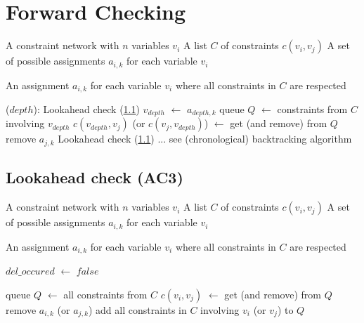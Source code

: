 \documentclass[alternative-exam.tex]{subfiles}
\newcommand{\algorithmicinput}{\textbf{Input:}}
\newcommand{\algorithmicoutput}{\textbf{Output:}}
\newcommand{\INPUT}{\item[\algorithmicinput]}
\newcommand{\OUTPUT}{\item[\algorithmicoutput]}
\newcommand{\algorithmicalgo}{\textbf{Algorithm:}}
\newcommand{\ALGO}{\item[\algorithmicalgo]}
\begin{document}
\section{Forward Checking}
\begin{algorithmic}
\label{forwardchecking}
\INPUT
\STATE A constraint network with $n$ variables $v_i$
\STATE A list $C$ of constraints $c(v_i,v_j)$
\STATE A set of possible assignments $a_{i,k}$ for each variable $v_i$

\OUTPUT
\STATE An assignment $a_{i,k}$ for each variable $v_i$ where all constraints in $C$ are respected
\end{algorithmic}\begin{algorithmic}
\ALGO($depth$):
\STATE Lookahead check (\ref{lookaheadcheck})
\STATE $v_{depth}$ $\leftarrow$ $a_{depth,k}$
\STATE queue $Q$ $\leftarrow$ constraints from $C$ involving $v_{depth}$
\STATE $c(v_{depth},v_j)$ (or $c(v_j,v_{depth})$) $\leftarrow$ get (and remove) from $Q$
\STATE remove $a_{j,k}$
\ENDIF
\ENDWHILE
\STATE Lookahead check (\ref{lookaheadcheck})
\STATE ... see (chronological) backtracking algorithm
\ENDFOR
\end{algorithmic}

\subsection{Lookahead check (AC3)}
\label{lookaheadcheck}
\begin{algorithmic}
\INPUT
\STATE A constraint network with $n$ variables $v_i$
\STATE A list $C$ of constraints $c(v_i,v_j)$
\STATE A set of possible assignments $a_{i,k}$ for each variable $v_i$

\OUTPUT
\STATE An assignment $a_{i,k}$ for each variable $v_i$ where all constraints in $C$ are respected
\end{algorithmic}\begin{algorithmic}
\ALGO

\STATE $del\_occured$ $\leftarrow$ $false$

\STATE queue $Q$ $\leftarrow$ all constraints from $C$
\STATE $c(v_i,v_j)$ $\leftarrow$ get (and remove) from $Q$
\STATE remove $a_{i,k}$ (or $a_{j,k}$)
\STATE add all constraints in $C$ involving $v_i$ (or $v_j$) to $Q$
\ENDIF
\ENDWHILE
\end{algorithmic}
\pagebreak
\end{document}
